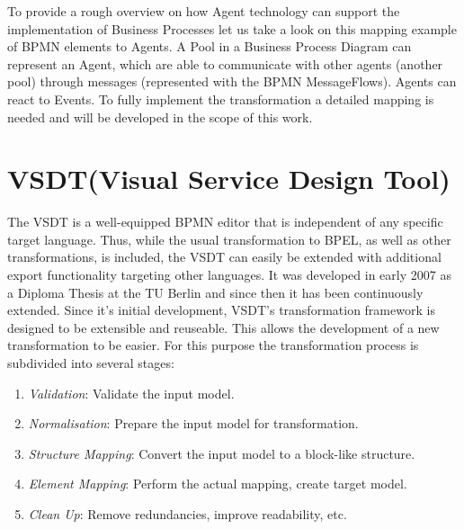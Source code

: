 To provide a rough overview on how Agent technology can support the implementation of Business Processes let us take a look on this mapping example of BPMN elements to Agents. A Pool in a Business Process Diagram can represent an Agent, which are able to communicate with other agents (another pool) through messages (represented with the BPMN MessageFlows). Agents can react to Events. To fully implement the transformation a detailed mapping is needed and will be developed in the scope of this work. 

\section{VSDT(Visual Service Design Tool)}
\label{sec:vsdt}
The VSDT \cite{5,2,3,1} is a well-equipped BPMN editor that is independent of any specific target language. Thus, while the usual transformation to BPEL, as well as other transformations, is included, the VSDT can easily be extended with additional export functionality targeting other languages. It was developed in early 2007 as a Diploma Thesis at the TU Berlin and since then it has been continuously extended. Since it's initial development, VSDT's transformation framework is designed to be extensible and reuseable. This allows the development of a new transformation to be easier. For this purpose the transformation process is subdivided into several stages: 
\begin{enumerate}
	\item \textit{Validation}: Validate the input model.
	\item \textit{Normalisation}: Prepare the input model for transformation.
	\item \textit{Structure Mapping}: Convert the input model to a block-like structure.
	\item \textit{Element Mapping}: Perform the actual mapping, create target model.
	\item \textit{Clean Up}: Remove redundancies, improve readability, etc.
\end{enumerate}

